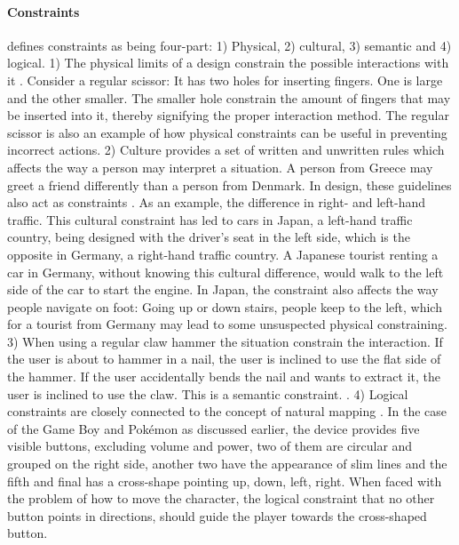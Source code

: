 \paragraph{Constraints}  defines constraints as being four-part: 1) Physical, 2) cultural, 3) semantic and 4) logical. 1) The physical limits of a design constrain the possible interactions with it \cite{norman}. Consider a regular scissor: It has two holes for inserting fingers. One is large and the other smaller. The smaller hole constrain the amount of fingers that may be inserted into it, thereby signifying the proper interaction method. The regular scissor is also an example of how physical constraints can be useful in preventing incorrect actions. 2) Culture provides a set of written and unwritten rules which affects the way a person may interpret a situation. A person from Greece may greet a friend differently than a person from Denmark. In design, these guidelines also act as constraints \cite{norman}. As an example, the difference in right- and left-hand traffic. This cultural constraint has led to cars in Japan, a left-hand traffic country, being designed with the driver's seat in the left side, which is the opposite in Germany, a right-hand traffic country. A Japanese tourist renting a car in Germany, without knowing this cultural difference, would walk to the left side of the car to start the engine. In Japan, the constraint also affects the way people navigate on foot: Going up or down stairs, people keep to the left, which for a tourist from Germany may lead to some unsuspected physical constraining. 3) When using a regular claw hammer the situation constrain the interaction. If the user is about to hammer in a nail, the user is inclined to use the flat side of the hammer. If the user accidentally bends the nail and wants to extract it, the user is inclined to use the claw. This is a semantic constraint. \cite{norman}. 4) Logical constraints are closely connected to the concept of natural mapping \cite{norman}. In the case of the Game Boy and Pokémon as discussed earlier, the device provides five visible buttons, excluding volume and power, two of them are circular and grouped on the right side, another two have the appearance of slim lines and the fifth and final has a cross-shape pointing up, down, left, right. When faced with the problem of how to move the character, the logical constraint that no other button points in directions, should guide the player towards the cross-shaped button.

